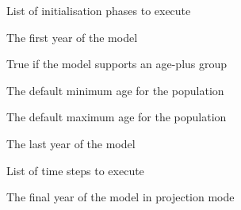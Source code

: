 
 {List of initialisation phases to execute}

 {The first year of the model}

 {True if the model supports an age-plus group}

 {The default minimum age for the population}

 {The default maximum age for the population}

 {The last year of the model}

 {List of time steps to execute}

 {The final year of the model in projection mode}

